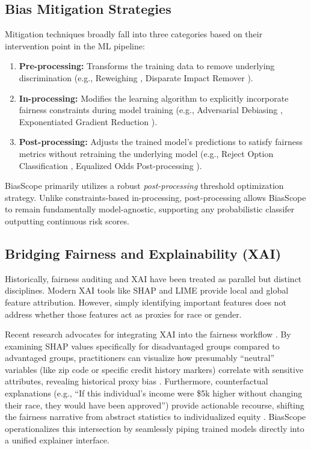 \documentclass[conference]{IEEEtran}
\begin{document}
\subsection{Bias Mitigation Strategies}
Mitigation techniques broadly fall into three categories based on their intervention point in the ML pipeline:
\begin{enumerate}
    \item \textbf{Pre-processing:} Transforms the training data to remove underlying discrimination (e.g., Reweighing \cite{kamiran2012data}, Disparate Impact Remover \cite{feldman2015certifying}).
    \item \textbf{In-processing:} Modifies the learning algorithm to explicitly incorporate fairness constraints during model training (e.g., Adversarial Debiasing \cite{zhang2018mitigating}, Exponentiated Gradient Reduction \cite{agarwal2018reductions}).
    \item \textbf{Post-processing:} Adjusts the trained model's predictions to satisfy fairness metrics without retraining the underlying model (e.g., Reject Option Classification \cite{kamiran2012decision}, Equalized Odds Post-processing \cite{hardt2016equality}).
\end{enumerate}
BiasScope primarily utilizes a robust \emph{post-processing} threshold optimization strategy. Unlike constraints-based in-processing, post-processing allows BiasScope to remain fundamentally model-agnostic, supporting any probabilistic classifer outputting continuous risk scores.

\subsection{Bridging Fairness and Explainability (XAI)}
Historically, fairness auditing and XAI have been treated as parallel but distinct disciplines. Modern XAI tools like SHAP \cite{lundberg2017unified} and LIME \cite{ribeiro2016should} provide local and global feature attribution. However, simply identifying important features does not address whether those features act as proxies for race or gender. 

Recent research advocates for integrating XAI into the fairness workflow \cite{rudin2019stop, wachter2017counterfactual}. By examining SHAP values specifically for disadvantaged groups compared to advantaged groups, practitioners can visualize how presumably ``neutral'' variables (like zip code or specific credit history markers) correlate with sensitive attributes, revealing historical proxy bias \cite{merrick2020explanation}. Furthermore, counterfactual explanations (e.g., ``If this individual's income were \$5k higher without changing their race, they would have been approved'') provide actionable recourse, shifting the fairness narrative from abstract statistics to individualized equity \cite{wachter2017counterfactual}. BiasScope operationalizes this intersection by seamlessly piping trained models directly into a unified explainer interface.
\end{document}
